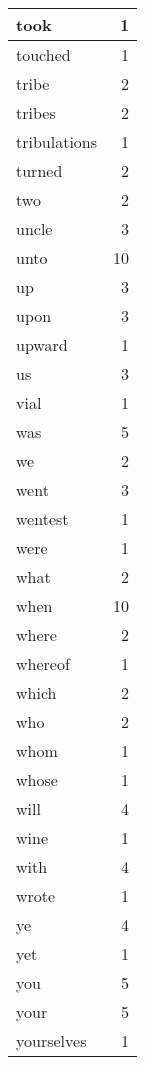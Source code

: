 \begin{center}
\begin{longtable}{l|r}
took & 1 \\ \hline
touched & 1 \\ \hline
tribe & 2 \\ \hline
tribes & 2 \\ \hline
tribulations & 1 \\ \hline
turned & 2 \\ \hline
two & 2 \\ \hline
uncle & 3 \\ \hline
unto & 10 \\ \hline
up & 3 \\ \hline
upon & 3 \\ \hline
upward & 1 \\ \hline
us & 3 \\ \hline
vial & 1 \\ \hline
was & 5 \\ \hline
we & 2 \\ \hline
went & 3 \\ \hline
wentest & 1 \\ \hline
were & 1 \\ \hline
what & 2 \\ \hline
when & 10 \\ \hline
where & 2 \\ \hline
whereof & 1 \\ \hline
which & 2 \\ \hline
who & 2 \\ \hline
whom & 1 \\ \hline
whose & 1 \\ \hline
will & 4 \\ \hline
wine & 1 \\ \hline
with & 4 \\ \hline
wrote & 1 \\ \hline
ye & 4 \\ \hline
yet & 1 \\ \hline
you & 5 \\ \hline
your & 5 \\ \hline
yourselves & 1 \\ \hline
\end{longtable}
\end{center}



\normalsize



